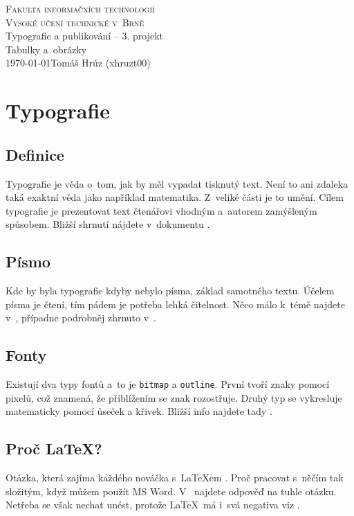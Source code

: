 \documentclass[a4paper, 11pt]{article}
\begin{document}
\begin{titlepage}
\begin{center}
\textsc{\Huge Fakulta informačních technologií\\
Vysoké učení technické v~Brně}\\
\LARGE Typografie a publikování -- 3. projekt\\
\Huge{Tabulky a~obrázky}\\
\Large \today \hfill         Tomáš Hrúz (xhruzt00)
\newpage
\end{center}
\end{titlepage}

\section{Typografie}

\subsection{Definice}
Typografie je věda o~tom, jak by měl vypadat tisknutý text. Není to ani zdaleka taká exaktní věda jako například matematika.
Z~veliké části je to umění. Cílem typografie je prezentovat text čtenářovi vhodným a~autorem zamýšleným spůsobem.
Bližší shrnutí nájdete v~dokumentu \cite{Forisek}.

\subsection{Písmo}
Kde by byla typografie kdyby nebylo písma, základ samotného textu. Účelem písma je čtení, tím pádem je potřeba lehká čitelnost. Něco málo k~témě najdete v~\cite{Kilianova}, případne podrobněj zhrnuto v~\cite{Cerny}.

\subsection{Fonty}
Existují dva typy fontů a~to je \verb/bitmap/ a \verb/outline/. První tvoří znaky pomocí pixelů, což znamená, že přiblížením se znak rozostřuje. Druhý typ se vykresluje matematicky pomocí ůseček a křivek. Bližší info najdete tady \cite{Felici}.

\subsection{Proč \LaTeX ?}
Otázka, která zajíma každého nováčka s~\LaTeX em . Proč pracovat s~něčím tak složitým, když můžem použít MS Word. 
V~\cite{Svanda} najdete odpověď na tuhle otázku. Netřeba se však nechat unést, protože \LaTeX\ má i~svá negativa viz \cite{Olsak}.
\end{document}
